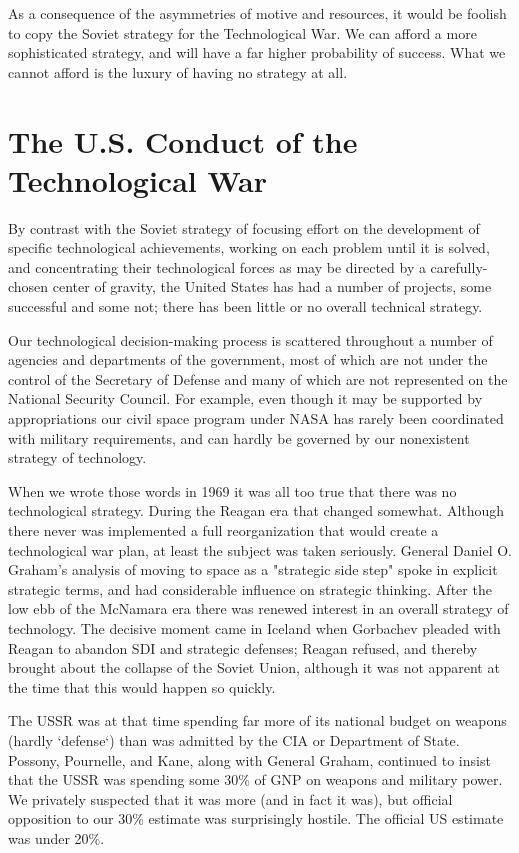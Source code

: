 As a consequence of the asymmetries of motive and resources, it would be foolish to copy the Soviet strategy for the Technological War. We can afford a more sophisticated strategy, and will have a far higher probability of success. What we cannot afford is the luxury of having no strategy at all.

\section{The U.S. Conduct of the Technological War}
By contrast with the Soviet strategy of focusing effort on the development of specific technological achievements, working on each problem until it is solved, and concentrating their technological forces as may be directed by a carefully-chosen center of gravity, the United States has had a number of projects, some successful and some not; there has been little or no overall technical strategy.

Our technological decision-making process is scattered throughout a number of agencies and departments of the government, most of which are not under the control of the Secretary of Defense and many of which are not represented on the National Security Council. For example, even though it may be supported by appropriations our civil space program under NASA has rarely been coordinated with military requirements, and can hardly be governed by our nonexistent strategy of technology.

\begin{mdframed}[backgroundcolor=black!10]
When we wrote those words in 1969 it was all too true that there was no technological strategy. During the Reagan era that changed somewhat. Although there never was implemented a full reorganization that would create a technological war plan, at least the subject was taken seriously. General Daniel O. Graham's analysis of moving to space as a "strategic side step" spoke in explicit strategic terms, and had considerable influence on strategic thinking.
After the low ebb of the McNamara era there was renewed interest in an overall strategy of technology. The decisive moment came in Iceland when Gorbachev pleaded with Reagan to abandon SDI and strategic defenses; Reagan refused, and thereby brought about the collapse of the Soviet Union, although it was not apparent at the time that this would happen so quickly.

The USSR was at that time spending far more of its national budget on weapons (hardly `defense`) than was admitted by the CIA or Department of State. Possony, Pournelle, and Kane, along with General Graham, continued to insist that the USSR was spending some 30\% of GNP on weapons and military power. We privately suspected that it was more (and in fact it was), but official opposition to our 30\% estimate was surprisingly hostile. The official US estimate was under 20\%.
\end{mdframed}

